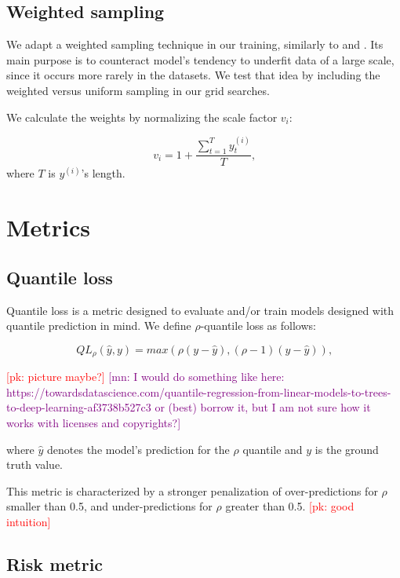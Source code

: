\documentclass[en]{pracamgr}
\newcommand{\pk}[1]{\textcolor{red}{\small [pk: #1]}}
\newcommand{\mn}[1]{\textcolor{purple}{\small [mn: #1]}}
\begin{document}

\subsection{Weighted sampling}

We adapt a weighted sampling technique in our training, similarly to \cite{enhancing} and \cite{deepar}. Its main purpose is to counteract model's tendency to underfit data of a large scale, since it occurs more rarely in the datasets. We test that idea by including the weighted versus uniform sampling in our grid searches.

We calculate the weights by normalizing the scale factor $v_i$:

$$ v_i = 1 + \frac{\sum^{T}_{t=1} y^{(i)}_t}{T} \text{,}$$
where $T$ is $y^{(i)}$'s length.

\section{Metrics}

\subsection{Quantile loss}

Quantile loss is a metric designed to evaluate and/or train models designed with quantile prediction in mind.
We define $\rho$-quantile loss as follows:

$$ QL_\rho(\hat{y}, y) = max(\rho(y - \hat{y}), (\rho - 1)(y - \hat{y})) \text{,} $$

\pk{picture maybe?} \mn{I would do something like here: https://towardsdatascience.com/quantile-regression-from-linear-models-to-trees-to-deep-learning-af3738b527c3 or (best) borrow it, but I am not sure how it works with licenses and copyrights?}

where $\hat{y}$ denotes the model's prediction for the $\rho$ quantile and $y$ is the ground truth value.

This metric is characterized by a stronger penalization of over-predictions for $\rho$ smaller than 0.5, and under-predictions for $\rho$ greater than 0.5. \pk{good intuition}

\subsection{Risk metric}
\end{document}
